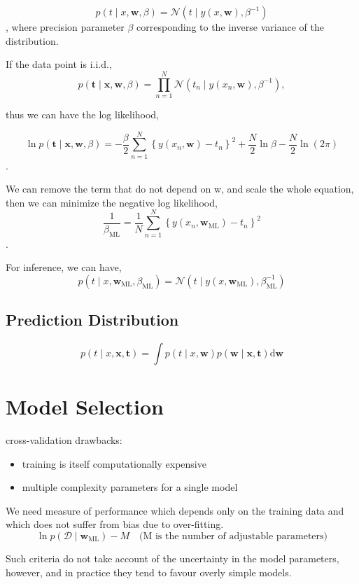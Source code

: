 \documentclass[11pt,en,cite=authoryear]{elegantpaper}
\begin{document}
$$p(t \mid x, \mathbf{w}, \beta)=\mathcal{N}\left(t \mid y(x, \mathbf{w}), \beta^{-1}\right)$$,
where precision parameter $\beta$ corresponding to the inverse variance of the distribution.

If the data point is i.i.d.,
$$p(\mathbf{t} \mid \mathbf{x}, \mathbf{w}, \beta)=\prod_{n=1}^{N} \mathcal{N}\left(t_{n} \mid y\left(x_{n}, \mathbf{w}\right), \beta^{-1}\right),$$

thus we can have the log likelihood,

$$\ln p(\mathbf{t} \mid \mathbf{x}, \mathbf{w}, \beta)=-\frac{\beta}{2} \sum_{n=1}^{N}\left\{y\left(x_{n}, \mathbf{w}\right)-t_{n}\right\}^{2}+\frac{N}{2} \ln \beta-\frac{N}{2} \ln (2 \pi)$$.

We can remove the term that do not depend on w, and scale the whole equation, then we can minimize the negative log likelihood,
$$\frac{1}{\beta_{\mathrm{ML}}}=\frac{1}{N} \sum_{n=1}^{N}\left\{y\left(x_{n}, \mathbf{w}_{\mathrm{ML}}\right)-t_{n}\right\}^{2}$$.

For inference, we can have,
$$
p\left(t \mid x, \mathbf{w}_{\mathrm{ML}}, \beta_{\mathrm{ML}}\right)=\mathcal{N}\left(t \mid y\left(x, \mathbf{w}_{\mathrm{ML}}\right), \beta_{\mathrm{ML}}^{-1}\right)
$$
\subsection{Prediction Distribution}
$$
p(t \mid x, \mathbf{x}, \mathbf{t})=\int p(t \mid x, \mathbf{w}) p(\mathbf{w} \mid \mathbf{x}, \mathbf{t}) \mathrm{d} \mathbf{w}
$$

\section{Model Selection}
cross-validation drawbacks:
\begin{itemize}
    \item training is itself computationally expensive
    \item multiple complexity parameters for a single model
\end{itemize}

We need measure of performance which depends only on the training data and which does not suffer from bias due to over-ﬁtting.
$$
\ln p\left(\mathcal{D} \mid \mathbf{w}_{\mathrm{ML}}\right)-M \quad \text{(M is the number of adjustable parameters)}
$$

Such criteria do not take account of the uncertainty in the model parameters, however, and in practice they tend to favour overly simple models.
\end{document}
